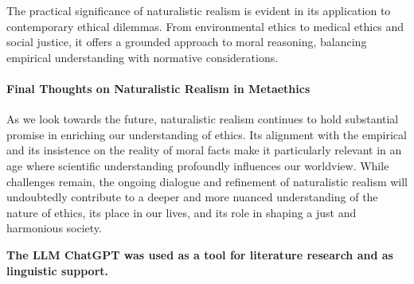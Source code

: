 \documentclass[12pt,a4paper]{article}
\begin{document}
The practical significance of naturalistic realism is evident in its application to contemporary ethical dilemmas. From environmental ethics to medical ethics and social justice, it offers a grounded approach to moral reasoning, balancing empirical understanding with normative considerations.

\paragraph{Final Thoughts on Naturalistic Realism in Metaethics}
As we look towards the future, naturalistic realism continues to hold substantial promise in enriching our understanding of ethics. Its alignment with the empirical and its insistence on the reality of moral facts make it particularly relevant in an age where scientific understanding profoundly influences our worldview. While challenges remain, the ongoing dialogue and refinement of naturalistic realism will undoubtedly contribute to a deeper and more nuanced understanding of the nature of ethics, its place in our lives, and its role in shaping a just and harmonious society.

\printbibliography

\textbf{The LLM ChatGPT was used as a tool for literature research and as linguistic support.}
\end{document}
